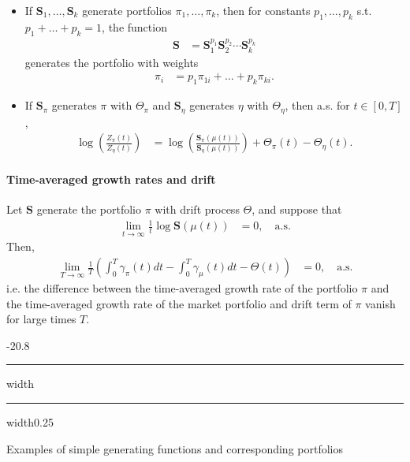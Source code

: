 \documentclass[a4paper,landscape,8pt,fleqn]{scrartcl}
\makeatletter
\renewcommand{\subsection}{\@startsection{subsection}{1}{0mm}%
{-2\baselineskip}{0.8\baselineskip}%
{\hrule depth 0.2pt width\columnwidth\hrule depth0.75pt
width0.25\columnwidth\vspace*{1.2em}\large\bfseries}}
\makeatother
\begin{document}
\begin{multicols*}{3}
\begin{itemize}
\item If $\pmb{S}_1, \ldots, \pmb{S}_k$ generate portfolios $\pi_1, \ldots, \pi_k$, then for constants $p_1, \ldots, p_k$ s.t. $p_1 + \ldots + p_k = 1$, the function
\begin{align*}
\pmb{S} &= \pmb{S}_1^{p_1} \pmb{S}_2^{p_2} \cdots \pmb{S}_k^{p_k}
\end{align*}
generates the portfolio with weights
\begin{align*}
\pi_i &= p_1 \pi_{1 i} + \ldots + p_k \pi_{k i}.
\end{align*}
\item If $\pmb{S}_\pi$ generates $\pi$ with $\Theta_\pi$ and $\pmb{S}_\eta$ generates $\eta$ with $\Theta_\eta$, then a.s. for $t \in [0,T]$,
\begin{align*}
\log \left( \frac{Z_\pi(t)}{Z_\eta(t)} \right) &= \log \left( \frac{\pmb{S}_\pi(\mu(t))}{\pmb{S}_\eta(\mu(t))} \right) + \Theta_\pi(t) - \Theta_\eta(t).
\end{align*}
\end{itemize}

\paragraph{Time-averaged growth rates and drift}

Let $\pmb{S}$ generate the portfolio $\pi$ with drift process $\Theta$, and suppose that
\begin{align*}
\lim_{t \to \infty} \frac{1}{t} \log \pmb{S}(\mu(t)) &= 0, \quad \text{a.s.}
\end{align*}
Then,
\begin{align*}
\lim_{T \to \infty} \frac{1}{T} \left( \int_0^T \gamma_\pi(t) dt - \int_0^T \gamma_\mu(t) dt - \Theta(t) \right) &= 0, \quad \text{a.s.}
\end{align*}
i.e. the difference between the time-averaged growth rate of the portfolio $\pi$ and the time-averaged growth rate of the market portfolio and drift term of $\pi$ vanish for large times $T$.

\subsection{Examples of simple generating functions and corresponding portfolios}


\end{multicols*}
\end{document}
